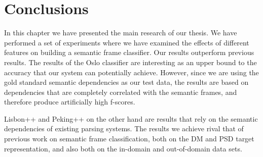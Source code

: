 \section{Conclusions}

In this chapter we have presented the main research of our thesis. We have performed a set of experiments where we have examined the effects of different features on building a semantic frame classifier. Our results outperform previous results. The results of the Oslo classifier are interesting as an upper bound to the accuracy that our system can potentially achieve. However, since we are using the gold standard semantic dependencies as our test data, the results are based on dependencies that are completely correlated with the semantic frames, and therefore produce artificially high f-scores. 

Lisbon++ and Peking++ on the other hand are results that rely on the semantic dependencies of existing parsing systems. The results we achieve  rival that of previous work on semantic frame classification, both on the DM and PSD target representation, and also both on the in-domain and out-of-domain data sets. 